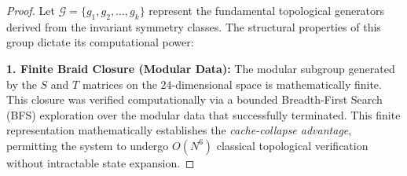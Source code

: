 \begin{proof}
Let $\mathcal{G} = \{g_1, g_2, \dots, g_k\}$ represent the fundamental topological generators derived from the invariant symmetry classes. The structural properties of this group dictate its computational power:

\textbf{1. Finite Braid Closure (Modular Data):} The modular subgroup generated by the $S$ and $T$ matrices on the $24$-dimensional space is mathematically finite. This closure was verified computationally via a bounded Breadth-First Search (BFS) exploration over the modular data that successfully terminated. This finite representation mathematically establishes the \textit{cache-collapse advantage}, permitting the system to undergo $O(N^6)$ classical topological verification without intractable state expansion.


\end{proof}
